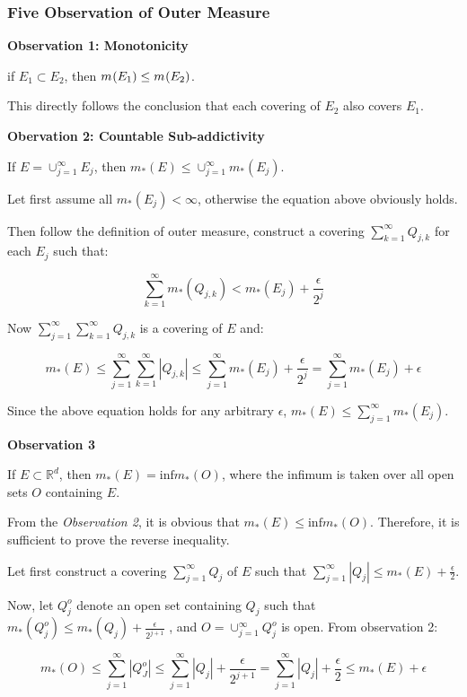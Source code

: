 \documentclass[
]{article}
\date{}
\begin{document}
\hypertarget{header-n0}{%
\subsubsection{Five Observation of Outer Measure}\label{header-n0}}

\textbf{Observation 1: Monotonicity}

if \(E_1 \subset E_2\), then \(m_{\*}(E_1)\leq m_{\*}(E_2)\).

This directly follows the conclusion that each covering of \(E_2\) also
covers \(E_1\).

\textbf{Obervation 2: Countable Sub-addictivity}

If \(E = \cup_{j=1}^{\infty}E_j\), then
\(m_{*}(E)\leq\cup_{j=1}^{\infty}m_{*}(E_j)\).

Let first assume all \(m_*(E_j)<\infty\), otherwise the equation above
obviously holds.

Then follow the definition of outer measure, construct a covering
\(\sum_{k=1}^{\infty}Q_{j,k}\) for each \(E_j\) such that:

\[\sum_{k=1}^{\infty}m_{*}(Q_{j,k}) < m_{*}(E_j) + \frac{\epsilon}{2^j}\]

Now \(\sum_{j=1}^{\infty}\sum_{k=1}^{\infty}Q_{j, k}\) is a covering of
\(E\) and:

\[m_{*}(E)\leq \sum_{j=1}^{\infty}\sum_{k=1}^{\infty}|Q_{j, k}|\leq\sum_{j=1}^{\infty}m_*(E_j)+\frac{\epsilon}{2^j}=\sum_{j=1}^{\infty}m_*(E_j)+\epsilon\]

Since the above equation holds for any arbitrary \(\epsilon\),
\(m_*(E)\leq\sum_{j=1}^{\infty}m_*(E_j)\).

\textbf{Observation 3}

If \(E \subset\mathbb{R}^d\), then \(m_*(E)=\mathrm{inf}m_*(O)\), where the
infimum is taken over all open sets \(O\) containing \(E\).

From the \emph{Observation 2}, it is obvious that
\(m_*(E)\leq \mathrm{inf}m_*(O)\). Therefore, it is sufficient to prove
the reverse inequality.

Let first construct a covering \(\sum_{j=1}^{\infty}Q_j\) of \(E\) such
that \(\sum_{j=1}^{\infty}|Q_j|\leq m_*(E)+\frac{\epsilon}{2}\).

Now, let \(Q_{j}^o\) denote an open set containing \(Q_j\) such that
\(m_*(Q_j^o)\leq m_*(Q_j)+\frac{\epsilon}{2^{j+1}} \) , and
\(O=\cup_{j=1}^{\infty}Q_{j}^o\) is open. From observation 2:

\[m_*(O)\leq \sum_{j=1}^{\infty}|Q_J^o|\leq\sum_{j=1}^{\infty}|Q_j|+\frac{\epsilon}{2^{{j+1}}}=\sum_{j=1}^{\infty}|Q_j|+\frac{\epsilon}{2}\leq m_*(E)+\epsilon\]
\end{document}
